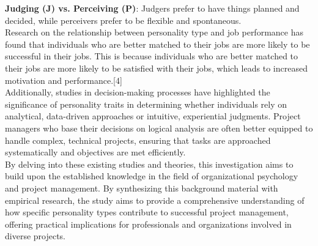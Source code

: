 \documentclass[a4Paper]{article}
\begin{document}
\textbf{Judging (J) vs. Perceiving (P)}: Judgers prefer to have things planned and decided, while perceivers prefer to be flexible and spontaneous.\\

Research on the relationship between personality type and job performance has found that individuals who are better matched to their jobs are more likely to be successful in their jobs. This is because individuals who are better matched to their jobs are more likely to be satisfied with their jobs, which leads to increased motivation and performance.[4]\\

Additionally, studies in decision-making processes have highlighted the significance of personality traits in determining whether individuals rely on analytical, data-driven approaches or intuitive, experiential judgments. Project managers who base their decisions on logical analysis are often better equipped to handle complex, technical projects, ensuring that tasks are approached systematically and objectives are met efficiently.\\

By delving into these existing studies and theories, this investigation aims to build upon the established knowledge in the field of organizational psychology and project management. By synthesizing this background material with empirical research, the study aims to provide a comprehensive understanding of how specific personality types contribute to successful project management, offering practical implications for professionals and organizations involved in diverse projects.


\pagebreak

\pagebreak
\end{document}
